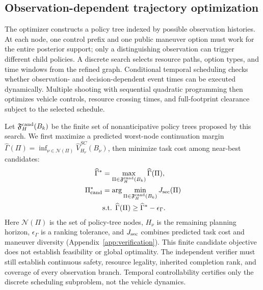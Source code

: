 \documentclass[letterpaper]{article} %
\begin{document}
\subsection{Observation-dependent trajectory optimization}
\label{sec:optimization}
The optimizer constructs a policy tree indexed by possible observation histories. At each node, one control prefix and one public maneuver option must work for the entire posterior support; only a distinguishing observation can trigger different child policies. A discrete search selects resource paths, option types, and time windows from the refined graph. Conditional temporal scheduling checks whether observation- and decision-dependent event times can be executed dynamically. Multiple shooting with sequential quadratic programming then optimizes vehicle controls, resource crossing times, and full-footprint clearance subject to the selected schedule.

Let $\mathfrak F_H^{\rm cand}(B_k)$ be the finite set of nonanticipative policy trees proposed by this search. We first maximize a predicted worst-node continuation margin $\widehat\Gamma(\Pi)=\inf_{\nu\in\mathcal N(\Pi)}\widehat V_{H_\nu}^{SC}(B_\nu)$, then minimize task cost among near-best candidates:
\begin{equation}
\begin{aligned}
\widehat\Gamma^*&=\max_{\Pi\in\mathfrak F_H^{\rm cand}(B_k)}\widehat\Gamma(\Pi),\\
\Pi^*_{\rm cand}&=\arg\min_{\Pi\in\mathfrak F_H^{\rm cand}(B_k)} J_{\rm sec}(\Pi)\\
&\text{s.t. }\widehat\Gamma(\Pi)\geq\widehat\Gamma^*-\epsilon_\Gamma.
\end{aligned}
\label{eq:lex-opt}
\end{equation}
Here $\mathcal N(\Pi)$ is the set of policy-tree nodes, $H_\nu$ is the remaining planning horizon, $\epsilon_\Gamma$ is a ranking tolerance, and $J_{\rm sec}$ combines predicted task cost and maneuver diversity (Appendix~\ref{app:verification}). This finite candidate objective does not establish feasibility or global optimality. The independent verifier must still establish continuous safety, resource legality, inherited completion rank, and coverage of every observation branch. Temporal controllability certifies only the discrete scheduling subproblem, not the vehicle dynamics.
\end{document}
